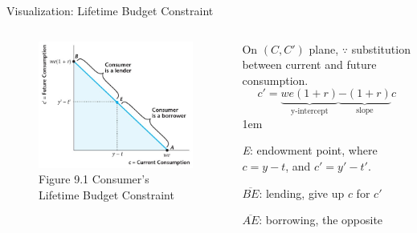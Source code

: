 \documentclass[11pt,aspectratio=43]{beamer}
\let\olditemize=\itemize
\let\endolditemize=\enditemize
\renewenvironment{itemize}{\olditemize \itemsep1em}{\endolditemize}
\theoremstyle{definition}
\begin{document}
\begin{frame}{Visualization: Lifetime Budget Constraint}
\label{slide:Visualization__Lifetime_Budget_Constraint}
    \begin{columns}
        \begin{column}{0.5\textwidth}
            \begin{figure}
                \caption{\scriptsize Figure 9.1 Consumer’s Lifetime Budget Constraint}
                \includegraphics[width=\textwidth]{./figures/Figure9_1.jpg}
            \end{figure}
        \end{column}
        \begin{column}{0.5\textwidth}
            On $ ( C, C' ) $ plane, $ \because $ substitution between current and future consumption.
            \begin{equation*}
                 c' = \underbrace{we ( 1+r )}_{\text{y-intercept}} \underbrace{-( 1+r )}_{\text{slope}} c
            \end{equation*}
            \begin{itemize}
                \item \textit{E}: \alert{endowment point}, where $ c = y-t $, and $ c' = y' - t' $.
                \item $\overline{BE}$: lending, give up $ c $ for $ c' $
                \item $\overline{AE}$: borrowing, the opposite
            \end{itemize}
        \end{column}
    \end{columns}
\end{frame}
\end{document}
